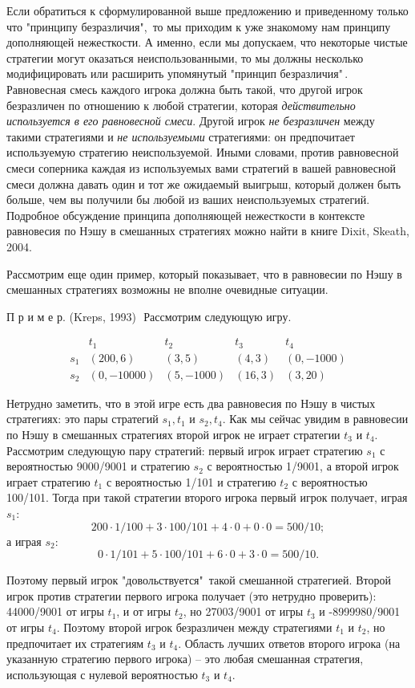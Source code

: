 \documentclass[12pt]{article}
\begin{document}
{Если обратиться к сформулированной выше предложению и приведенному
только что "принципу безразличия",\, то мы приходим к уже знакомому нам
принципу дополняющей нежесткости. А именно, если мы допускаем, что
некоторые чистые стратегии могут оказаться неиспользованными, то мы
должны несколько модифицировать или расширить упомянутый "принцип
безразличия"\,. Равновесная смесь каждого игрока должна быть такой,
что другой игрок безразличен по отношению к любой стратегии, которая
\emph{действительно используется в его равновесной смеси}. Другой игрок
\emph{не безразличен} между такими стратегиями и \emph{не используемыми}
стратегиями: он предпочитает используемую стратегию неиспользуемой.
Иными словами, против равновесной смеси соперника каждая из используемых
вами стратегий в вашей равновесной смеси должна давать один и тот же
ожидаемый выигрыш, который должен быть больше, чем вы получили бы любой
из ваших неиспользуемых стратегий. Подробное обсуждение принципа
дополняющей нежесткости в контексте равновесия по Нэшу в смешанных
стратегиях можно найти в книге Dixit, Skeath, 2004.

Рассмотрим еще один пример, который показывает, что в равновесии по
Нэшу в смешанных стратегиях возможны не вполне очевидные ситуации.

П р и м е р. (Kreps, 1993)\,\, Рассмотрим следующую игру.

$$\begin{array}{rcccl}
&t_1&t_2&t_3&t_4\\
s_1&(200,6)&(3,5)&(4,3)&(0,-1000)\\
s_2&(0,-10000)&(5,-1000)&(16,3)&(3,20)
\end{array}$$

Нетрудно заметить, что в этой игре есть два равновесия по Нэшу в
чистых стратегиях: это пары стратегий $s_1, t_1$  и $s_2, t_4$. Как
мы сейчас увидим в равновесии по Нэшу в смешанных стратегиях второй
игрок не играет стратегии $t_3$ и $t_4$. Рассмотрим следующую пару
стратегий: первый игрок играет стратегию $s_1$ с вероятностью
9000/9001 и стратегию $s_2$ с вероятностью 1/9001, а второй игрок
играет стратегию  $t_1$ с вероятностью 1/101 и стратегию $t_2$ с
вероятностью 100/101. Тогда при такой стратегии второго игрока
первый игрок получает, играя $s_1$:
$$200\cdot1/100+3\cdot100/101+4\cdot0+0\cdot0=500/10;$$
а играя $s_2$:
$$0\cdot1/101+5\cdot100/101+6\cdot0+3\cdot0=500/10.$$

Поэтому первый игрок "довольствуется"\, такой смешанной стратегией.
Второй игрок против стратегии первого игрока получает (это нетрудно
проверить): 44000/9001 от игры $t_1$, и от игры $t_2$, но 27003/9001
от игры $t_3$ и -8999980/9001 от игры $t_4$. Поэтому второй игрок
безразличен между стратегиями $t_1$ и $t_2$, но предпочитает их
стратегиям $t_3$ и $t_4$. Область лучших ответов второго игрока (на
указанную стратегию первого игрока) -- это любая смешанная
стратегия, использующая с нулевой вероятностью $t_3$ и $t_4$.

}
\end{document}
